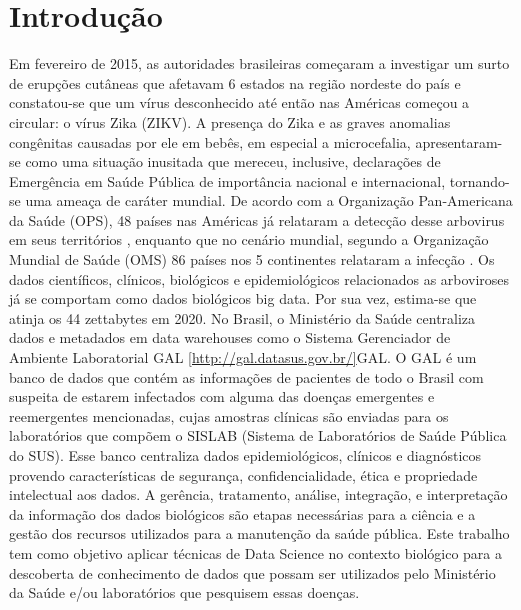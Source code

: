 \chapter{Introdução}

Em fevereiro de 2015, as autoridades brasileiras começaram a investigar um surto de erupções cutâneas que afetavam 6 estados na região nordeste do país e constatou-se que um vírus desconhecido até então nas Américas começou a circular: o vírus Zika (ZIKV). A presença do Zika e as graves anomalias congênitas causadas por ele em bebês, em especial a microcefalia, apresentaram-se como uma situação inusitada que mereceu, inclusive, declarações de Emergência em Saúde Pública de importância nacional e internacional, tornando-se uma ameaça de caráter mundial.
De acordo com a Organização Pan-Americana da Saúde (OPS), 48 países nas Américas  já relataram a detecção desse arbovirus em seus territórios \cite{ops}, enquanto que no cenário mundial, segundo a Organização Mundial de Saúde (OMS) 86 países nos 5 continentes relataram a infecção \cite{who}.
Os dados científicos, clínicos, biológicos e epidemiológicos relacionados as arboviroses já se comportam como dados biológicos big data. Por sua vez, estima-se que atinja os 44 zettabytes em 2020.
No Brasil, o Ministério da Saúde centraliza dados e metadados em data warehouses como o Sistema Gerenciador de Ambiente Laboratorial GAL \ref{http://gal.datasus.gov.br/}{GAL}.
O GAL é um banco de dados que contém as informações de pacientes de todo o Brasil com suspeita de estarem infectados com alguma das doenças emergentes e reemergentes mencionadas, cujas amostras clínicas são enviadas para os laboratórios que compõem o SISLAB (Sistema de Laboratórios de Saúde Pública do SUS). Esse banco centraliza dados epidemiológicos, clínicos e diagnósticos provendo características de segurança, confidencialidade, ética e propriedade intelectual aos dados.
A gerência, tratamento, análise, integração, e interpretação da informação dos dados biológicos são etapas necessárias para a ciência e a gestão dos recursos utilizados para a manutenção da saúde pública. Este trabalho tem como objetivo aplicar técnicas de Data Science no contexto biológico para a descoberta de conhecimento de dados que possam ser utilizados pelo Ministério da Saúde e/ou laboratórios que pesquisem essas doenças.
